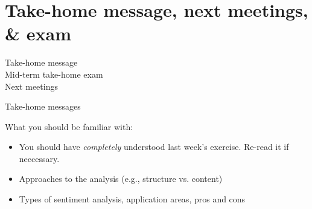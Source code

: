 \documentclass{beamer}
\begin{document}
%
%
%
%




\section[Next meetings]{Take-home message, next meetings, \& exam}
\begin{frame}
Take-home message\\
Mid-term take-home exam\\
Next meetings
\end{frame}



\begin{frame}{Take-home messages}
\begin{block}{What you should be familiar with:}
\begin{itemize}
\item You should have \emph{completely} understood last week's exercise. Re-read it if neccessary.
\item Approaches to the analysis (e.g., structure vs. content)
\item Types of sentiment analysis, application areas, pros and cons
\end{itemize}
\end{block}
\end{frame}
\end{document}
